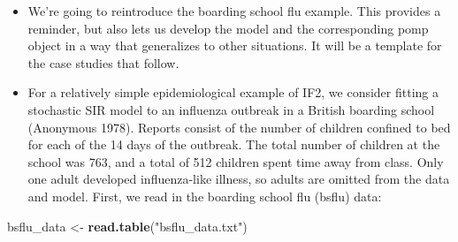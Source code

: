 \documentclass[]{article}
\newenvironment{Shaded}{\begin{snugshade}}{\end{snugshade}}
\newcommand{\KeywordTok}[1]{\textcolor[rgb]{0.13,0.29,0.53}{\textbf{#1}}}
\newcommand{\StringTok}[1]{\textcolor[rgb]{0.31,0.60,0.02}{#1}}
\newcommand{\NormalTok}[1]{#1}
\begin{document}
\begin{itemize}
\item
  We're going to reintroduce the boarding school flu example. This
  provides a reminder, but also lets us develop the model and the
  corresponding pomp object in a way that generalizes to other
  situations. It will be a template for the case studies that follow.
\item
  For a relatively simple epidemiological example of IF2, we consider
  fitting a stochastic SIR model to an influenza outbreak in a British
  boarding school (Anonymous 1978). Reports consist of the number of
  children confined to bed for each of the 14 days of the outbreak. The
  total number of children at the school was 763, and a total of 512
  children spent time away from class. Only one adult developed
  influenza-like illness, so adults are omitted from the data and model.
  First, we read in the boarding school flu (bsflu) data:
\end{itemize}

\begin{Shaded}
\begin{Highlighting}[]
\NormalTok{bsflu_data <-}\StringTok{ }\KeywordTok{read.table}\NormalTok{(}\StringTok{"bsflu_data.txt"}\NormalTok{)}
\end{Highlighting}
\end{Shaded}
\end{document}
